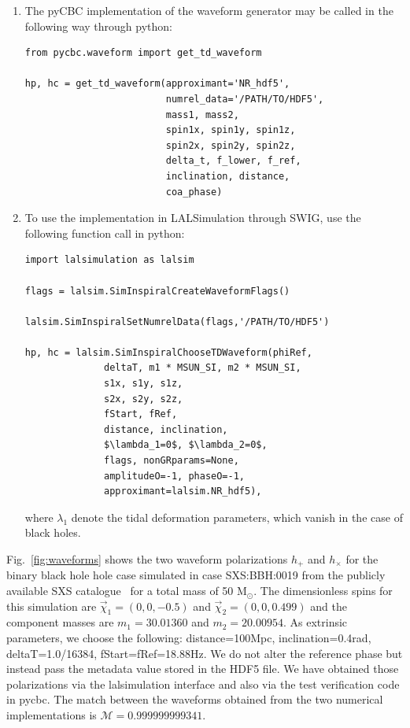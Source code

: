 \documentclass[aps,prd,amssymb,amsmath,amsfonts,superscriptaddress,
floatfix ,preprintnumbers,altaffilletter]{revtex4}
\begin{document}
\begin{enumerate}
  \item The pyCBC implementation of the waveform generator may be called in the following way through python: \\
\begin{lstlisting}
from pycbc.waveform import get_td_waveform 

hp, hc = get_td_waveform(approximant='NR_hdf5', 
                         numrel_data='/PATH/TO/HDF5',
                         mass1, mass2,
                         spin1x, spin1y, spin1z,
                         spin2x, spin2y, spin2z, 
                         delta_t, f_lower, f_ref,
                         inclination, distance, 
                         coa_phase)
\end{lstlisting}

\item To use the implementation in LALSimulation through SWIG, use the following function call in python:\\
\begin{lstlisting}[mathescape=true]
import lalsimulation as lalsim

flags = lalsim.SimInspiralCreateWaveformFlags()

lalsim.SimInspiralSetNumrelData(flags,'/PATH/TO/HDF5')

hp, hc = lalsim.SimInspiralChooseTDWaveform(phiRef, 
              deltaT, m1 * MSUN_SI, m2 * MSUN_SI, 
              s1x, s1y, s1z,
              s2x, s2y, s2z, 
              fStart, fRef, 
              distance, inclination,
              $\lambda_1=0$, $\lambda_2=0$, 
              flags, nonGRparams=None, 
              amplitudeO=-1, phaseO=-1, 
              approximant=lalsim.NR_hdf5),
\end{lstlisting}
where $\lambda_1$ denote the tidal deformation parameters, which vanish in the case of black holes. 
\end{enumerate}
Fig.~\ref{fig:waveforms} shows the two waveform polarizations $h_+$ and $h_{\times}$ for the binary black hole hole case simulated in case 
SXS:BBH:0019 from the publicly available SXS catalogue~\cite{Mroue:2013xna} for a total mass of 50 $\mathrm{M}_\odot$. The dimensionless spins for this simulation are
$\vec{\chi}_1=(0,0,-0.5)$ and $\vec{\chi}_2=(0,0,0.499)$ and the component masses are $m_1=30.01360$ and $m_2=20.00954$.
As extrinsic parameters, we choose the following: distance=100Mpc, inclination=0.4rad, deltaT=1.0/16384, fStart=fRef=18.88Hz. We do not alter
the reference phase but instead pass the metadata value stored in the HDF5 file. We have obtained those polarizations via the lalsimulation interface and also via the test verification code in pycbc. The match between the waveforms obtained from the two numerical implementations is $\mathcal{M}=0.999999999341$.
\end{document}
